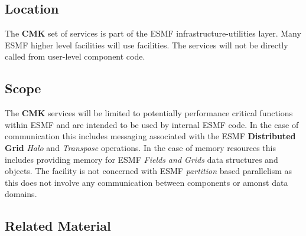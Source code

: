 \subsection{Location}

The {\bf CMK} set of services is part of the ESMF infrastructure-utilities 
layer. Many ESMF higher level facilities will use {\bf \shortname} facilities.
The {\bf \shortname} services will not be directly called from user-level
component code.


\subsection{Scope}

The {\bf CMK} services will be limited to potentially performance
critical functions within ESMF and are intended to be used by internal ESMF
code. In the case of communication this includes messaging associated with the 
ESMF {\bf Distributed Grid} {\it Halo} and {\it Transpose} 
operations. In the case of memory resources this includes providing 
memory for ESMF {\it Fields and Grids} data structures and objects.
The {\bf \shortname} facility is not concerned with ESMF {\it partition}
based parallelism as this does not involve any communication between
components or amonst data domains.


\subsection{Related Material}

